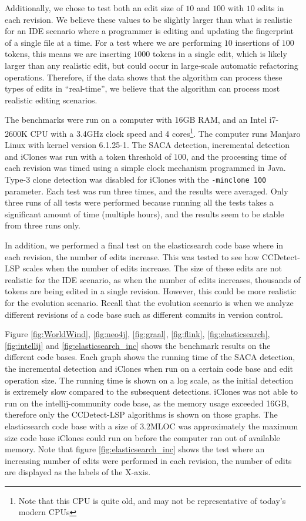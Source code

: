 Additionally, we chose to test both an edit size of $10$ and $100$ with $10$ edits in each
revision. We believe these values to be slightly larger than what is realistic for an IDE
scenario where a programmer is editing and updating the fingerprint of a single file at a
time. For a test where we are performing $10$ insertions of $100$ tokens, this means we
are inserting $1000$ tokens in a single edit, which is likely larger than any realistic
edit, but could occur in large-scale automatic refactoring operations. Therefore, if the
data shows that the algorithm can process these types of edits in ``real-time'', we believe
that the algorithm can process most realistic editing scenarios.

The benchmarks were run on a computer with 16GB RAM, and an Intel i7-2600K CPU with a
3.4GHz clock speed and 4 cores\footnote{Note that this CPU is quite old, and may not be
representative of today's modern CPUs}. The computer runs Manjaro Linux with kernel
version 6.1.25-1. The SACA detection, incremental detection and iClones was run with a
token threshold of $100$, and the processing time of each revision was timed using a
simple clock mechanism programmed in Java. Type-3 clone detection was disabled for iClones
with the \verb|-minclone 100| parameter. Each test was run three times, and the results
were averaged. Only three runs of all tests were performed because running all the tests
takes a significant amount of time (multiple hours), and the results seem to be stable
from three runs only.

In addition, we performed a final test on the elasticsearch code base where in each
revision, the number of edits increase. This was tested to see how CCDetect-LSP scales
when the number of edits increase. The size of these edits are not realistic for the IDE
scenario, as when the number of edits increases, thousands of tokens are being edited in a
single revision. However, this could be more realistic for the evolution scenario. Recall
that the evolution scenario is when we analyze different revisions of a code base such as
different commits in version control.


Figure \ref{fig:WorldWind}, \ref{fig:neo4j}, \ref{fig:graal}, \ref{fig:flink},
\ref{fig:elasticsearch}, \ref{fig:intellij} and \ref{fig:elasticsearch_inc} shows the
benchmark results on the different code bases. Each graph shows the running time of the
SACA detection, the incremental detection and iClones when run on a certain code base and
edit operation size. The running time is shown on a log scale, as the initial detection is
extremely slow compared to the subsequent detections. iClones was not able to run on the
intellij-community code base, as the memory usage exceeded 16GB, therefore only the
CCDetect-LSP algorithms is shown on those graphs. The elasticsearch code base with a size
of $3.2\text{MLOC}$ was approximately the maximum size code base iClones could run on
before the computer ran out of available memory. Note that figure
\ref{fig:elasticsearch_inc} shows the test where an increasing number of edits were
performed in each revision, the number of edits are displayed as the labels of the X-axis.

